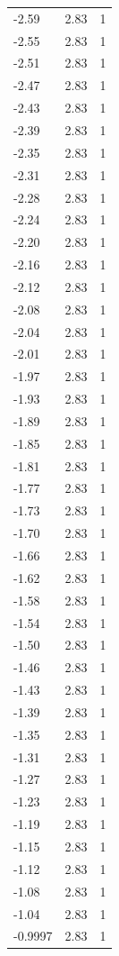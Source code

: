 \begin{longtable}{lrr}
  -2.59 & 2.83 & 1 \\
  -2.55 & 2.83 & 1 \\
  -2.51 & 2.83 & 1 \\
  -2.47 & 2.83 & 1 \\
  -2.43 & 2.83 & 1 \\
  -2.39 & 2.83 & 1 \\
  -2.35 & 2.83 & 1 \\
  -2.31 & 2.83 & 1 \\
  -2.28 & 2.83 & 1 \\
  -2.24 & 2.83 & 1 \\
  -2.20 & 2.83 & 1 \\
  -2.16 & 2.83 & 1 \\
  -2.12 & 2.83 & 1 \\
  -2.08 & 2.83 & 1 \\
  -2.04 & 2.83 & 1 \\
  -2.01 & 2.83 & 1 \\
  -1.97 & 2.83 & 1 \\
  -1.93 & 2.83 & 1 \\
  -1.89 & 2.83 & 1 \\
  -1.85 & 2.83 & 1 \\
  -1.81 & 2.83 & 1 \\
  -1.77 & 2.83 & 1 \\
  -1.73 & 2.83 & 1 \\
  -1.70 & 2.83 & 1 \\
  -1.66 & 2.83 & 1 \\
  -1.62 & 2.83 & 1 \\
  -1.58 & 2.83 & 1 \\
  -1.54 & 2.83 & 1 \\
  -1.50 & 2.83 & 1 \\
  -1.46 & 2.83 & 1 \\
  -1.43 & 2.83 & 1 \\
  -1.39 & 2.83 & 1 \\
  -1.35 & 2.83 & 1 \\
  -1.31 & 2.83 & 1 \\
  -1.27 & 2.83 & 1 \\
  -1.23 & 2.83 & 1 \\
  -1.19 & 2.83 & 1 \\
  -1.15 & 2.83 & 1 \\
  -1.12 & 2.83 & 1 \\
  -1.08 & 2.83 & 1 \\
  -1.04 & 2.83 & 1 \\
  -0.9997 & 2.83 & 1 \\

\end{longtable}
